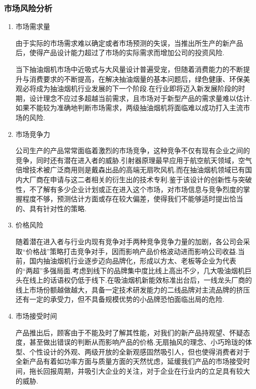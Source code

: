 \subsubsection{市场风险分析}
\begin{enumerate}
\item 市场需求量

      由于实际的市场需求难以确定或者市场预测的失误，当推出所生产的新产品后，使得产品设计能力超过了市场的实际需求而增加公司的投资风险.

      当下抽油烟机市场中近吸式与大风量设计普遍受宠，但随着消费能力的不断提升与消费要求的不断提高，在解决抽油烟量的基本问题后，绿色健康、环保美观必将成为抽油烟机行业发展的下一个阶段.在行业即将迈入新发展阶段的时期，设计理念不应过多超越当前需求，且市场对于新型产品的需求量难以估计.如果不能较为准确地判断市场需求，两级抽油烟机将面临难以成功打入主流市场的风险.

\item 市场竞争力

      公司生产的产品常常面临着激烈的市场竞争，这种竞争不仅有现有企业之间的竞争，同时还有潜在进入者的威胁.引射器原理最早应用于航空航天领域，空气倍增技术被广泛商用则是戴森出品的高端无扇吹风机.而在抽油烟机领域已有国内大厂商在申请与这二者相关的衍生出的技术专利.鉴于该设计的创新性与突破性，不了解有多少企业计划或正在进入这个市场，对市场信息与竞争烈度的掌握程度不够，预测估计方面或存在较大偏差，使得我们不能够适时提出恰当的、具有针对性的策略.

\item 价格风险

      随着潜在进入者与行业内现有竞争对手两种竞争竞争力量的加剧，各公司会采取“价格战”策略打击竞争对手，因而影响产品价格波动进而影响公司收益.当前，国内抽油烟机行业逐步迈向品牌化，形成以方太、老板等企业为代表的“两超”多强局面.考虑到线下的品牌集中度比线上高出不少，几大吸油烟机巨头在线上的话语权仍低于线下.在吸油烟机新能效标准出台后，一线龙头厂商的线上市场份额越做越大，具备一定技术研发能力的二线品牌对主流品牌的挤压还有一定的承受力，但不具备规模优势的小品牌恐怕面临出局的危险.

\item 市场接受时间

      产品推出后，顾客由于不能及时了解其性能，对我们的新产品持观望、怀疑态度，甚至做出错误的判断从而影响产品的价格.无扇抽风的理念、小巧玲珑的体型、个性设计的外观、两级开放的全新观感固然吸引人，但也使得消费者对于全新产品有着如功率方面与质量方面的天然忧虑，延缓我们产品的市场接受时间，拖长回报周期，并吸引大企业的关注，对于企业在行业内的立足具有较大的威胁.

\end{enumerate}
